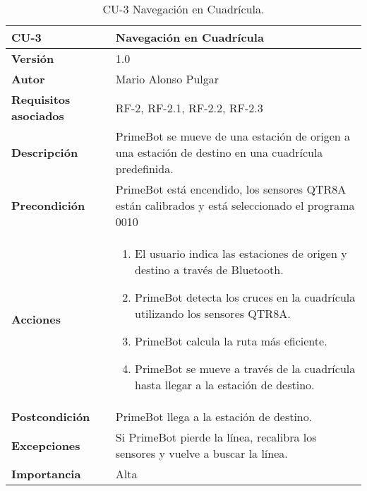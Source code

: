 \begin{table}[p]
	\centering
	\begin{tabularx}{\linewidth}{ p{} p{} }
		\toprule
		\textbf{CU-3}    & \textbf{Navegación en Cuadrícula}\\
		\toprule
		\textbf{Versión}              & 1.0    \\
		\textbf{Autor}                & Mario Alonso Pulgar \\
		\textbf{Requisitos asociados} & RF-2, RF-2.1, RF-2.2, RF-2.3 \\
		\textbf{Descripción}          & PrimeBot se mueve de una estación de origen a una estación de destino en una cuadrícula predefinida.\\
		\textbf{Precondición}         & PrimeBot está encendido, los sensores QTR8A están calibrados y está seleccionado el programa 0010\\
		\textbf{Acciones}             &
		\begin{enumerate}
			\def\labelenumi{\arabic{enumi}.}
			\tightlist
				\item El usuario indica las estaciones de origen y destino a través de Bluetooth.
				\item PrimeBot detecta los cruces en la cuadrícula utilizando los sensores QTR8A.
				\item PrimeBot calcula la ruta más eficiente.
				\item PrimeBot se mueve a través de la cuadrícula hasta llegar a la estación de destino.
		\end{enumerate}\\
		\textbf{Postcondición}        & PrimeBot llega a la estación de destino. \\
		\textbf{Excepciones}          & Si PrimeBot pierde la línea, recalibra los sensores y vuelve a buscar la línea.  \\
		\textbf{Importancia}          & Alta \\
		\bottomrule
	\end{tabularx}
	\caption{CU-3 Navegación en Cuadrícula.}
\end{table}

